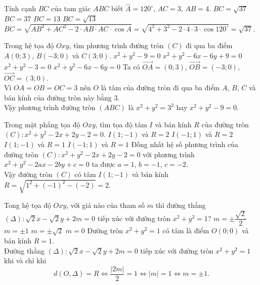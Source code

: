 \begin{ex}%
 Tính cạnh $BC$ của tam giác $ABC$ biết $\widehat{A} = 120^\circ$, $AC = 3$, $AB = 4$.
 \choice
  {\True $BC = \sqrt{37}$}
  {$BC = 37$}
  {$BC = 13$}
  {$BC = \sqrt{13}$}
 \loigiai
 {
 $BC = \sqrt{AB^2 + AC^2 - 2\cdot AB \cdot AC \cdot \cos A} = \sqrt{4^2 + 3^2 - 2 \cdot 4 \cdot 3 \cdot \cos 120^\circ} = \sqrt{37}$.
 }
\end{ex}


\begin{ex}%
 Trong hệ tọa độ $Oxy$, tìm phương trình đường tròn $(C)$ đi qua ba điểm $A(0;3)$, $B(-3;0)$ và $C(3;0)$.
 \choice
  {\True $x^2 + y^2 - 9 = 0$}
  {$x^2 + y^2 - 6x - 6y + 9 = 0$}
  {$x^2 + y^2 - 3 = 0$}
  {$x^2 + y^2 - 6x - 6y = 0$}
 \loigiai
 {
 Ta có $\vec{OA} = (0;3)$, $\vec{OB} = (-3;0)$, $\vec{OC} = (3;0)$.\\
 Vì $OA = OB = OC = 3$ nên $O$ là tâm của đường tròn đi qua ba điểm $A$, $B$, $C$ và bán kính của đường tròn này bằng $3$.\\
 Vậy phương trình đường tròn $(ABC)$ là $x^2 + y^2 = 3^2$ hay $x^2 + y^2 - 9 = 0$.
 }
\end{ex}


\begin{ex}%
 Trong mặt phẳng tọa độ $Oxy$, tìm tọa độ tâm $I$ và bán kính $R$ của đường tròn $(C): x^2 + y^2 - 2x + 2y - 2 = 0$.
 \choice
  {\True $I(1;-1)$ và $R = 2$}
  {$I(-1;1)$ và $R = 2$}
  {$I(1;-1)$ và $R = 1$}
  {$I(-1;1)$ và $R = 1$}
 \loigiai
 {
 Đồng nhất hệ số phương trình của đường tròn $(C): x^2 + y^2 - 2x + 2y - 2 = 0$ với phương trình $x^2 + y^2 - 2ax - 2by + c = 0$ ta được $a = 1$, $b = -1$, $c = -2$.\\
 Vậy đường tròn $(C)$ có tâm $I(1;-1)$ và bán kính $R = \sqrt{1^2 + (-1)^2 - (-2)} = 2$.
 }
\end{ex}


\begin{ex}%
 Tong hệ tọa độ $Oxy$, với giá nào của tham số $m$ thì đường thẳng $(\Delta): \sqrt{2}x - \sqrt{2}y + 2m = 0$ tiếp xúc với đường tròn $x^2 + y^2 = 1$?
 \choice
  {$m = \pm \dfrac{\sqrt{2}}{2}$}
  {\True $m = \pm 1$}
  {$m = \pm \sqrt{2}$}
  {$m = 0$}
 \loigiai
  {
  Đường tròn $x^2 + y^2 = 1$ có tâm là điểm $O(0;0)$ và bán kính $R = 1$.\\
  Đường thẳng $(\Delta): \sqrt{2}x - \sqrt{2}y + 2m = 0$ tiếp xúc với đường tròn $x^2 + y^2 = 1$ khi và chỉ khi
  $$d(O, \Delta) = R \Leftrightarrow \dfrac{|2m|}{2} = 1 \Leftrightarrow |m| = 1 \Leftrightarrow m = \pm 1.$$
  }
\end{ex}


